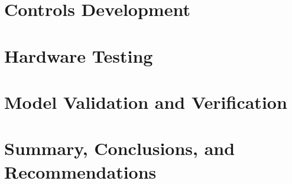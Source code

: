 \documentclass[12pt]{report}
\begin{document}
	\chapter{Controls Development}
	
	\chapter{Hardware Testing}
	
	\chapter{Model Validation and Verification}
	
	\chapter{Summary, Conclusions, and Recommendations}
	
	\renewcommand{\bibname}{References} %
	\setlength{\bibitemsep}{1cm}        %
	\cleardoublepage
	\uspunctuation
	\printbibliography
	
	
	
	
\end{document}
